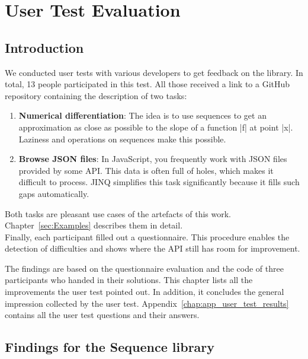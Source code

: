 \section{User Test Evaluation} %
\label{sec:User Test Evaluation}
\subsection{Introduction} %
\label{sub:Introduction}
We conducted user tests with various developers to get feedback on the library.
In total, 13 people participated in this test. All those received a link to a
GitHub repository containing the description of two tasks:
\begin{enumerate}
\item \textbf{Numerical differentiation}: The idea is to use sequences to get
  an approximation as close as possible to the slope of a function |f| at point
  |x|. Laziness and operations on sequences make this possible.
\item \textbf{Browse JSON files}: In JavaScript, you frequently work with JSON
  files provided by some API. This data is often full of holes, which makes it
  difficult to process. JINQ simplifies this task significantly because it
  fills such gaps automatically. 
\end{enumerate}
Both tasks are pleasant use cases of the artefacts of this work.
Chapter~\ref{sec:Examples} describes them in detail.\\
Finally, each participant filled out a questionnaire. This procedure enables
the detection of difficulties and shows where the API still has room for
improvement. 

The findings are based on the questionnaire evaluation and the code of three
participants who handed in their solutions. This chapter lists all the
improvements the user test pointed out. In addition, it concludes the general
impression collected by the user test.
Appendix~\ref{chap:app_user_test_results} contains all the user test questions
and their answers.

\subsection{Findings for the Sequence library} %
\label{sub:Findings for the sequence library}

